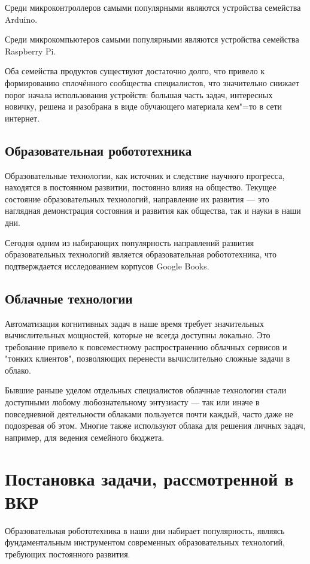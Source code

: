 Среди микроконтроллеров самыми популярными являются устройства семейства Arduino.

Среди микрокомпьютеров самыми популярными являются устройства семейства Raspberry Pi.

Оба семейства продуктов существуют достаточно долго, что привело к формированию сплочённого сообщества специалистов, что значительно снижает порог начала использования устройств: большая часть задач, интересных новичку, решена и разобрана в виде обучающего материала кем"=то в сети интернет.

\subsection{Образовательная робототехника}
Образовательные технологии, как источник и следствие научного прогресса, находятся в постоянном развитии, постоянно влияя на общество. Текущее состояние образовательных технологий, направление их развития --- это наглядная демонстрация состояния и развития как общества, так и науки в наши дни.

Сегодня одним из набирающих популярность направлений развития образовательных технологий является образовательная робототехника, что подтверждается исследованием корпусов Google Books.

\subsection{Облачные технологии}
Автоматизация когнитивных задач в наше время требует значительных вычислительных мощностей, которые не всегда доступны локально. Это требование привело к повсеместному распространению облачных сервисов и "тонких клиентов", позволяющих перенести вычислительно сложные задачи в облако.

Бывшие раньше уделом отдельных специалистов облачные технологии стали доступными любому любознательному энтузиасту --- так или иначе в повседневной деятельности облаками пользуется почти каждый, часто даже не подозревая об этом. Многие также используют облака для решения личных задач, например, для ведения семейного бюджета.

\section{Постановка задачи, рассмотренной в ВКР}
Образовательная робототехника в наши дни набирает популярность, являясь фундаментальным инструментом современных образовательных технологий, требующих постоянного развития.

